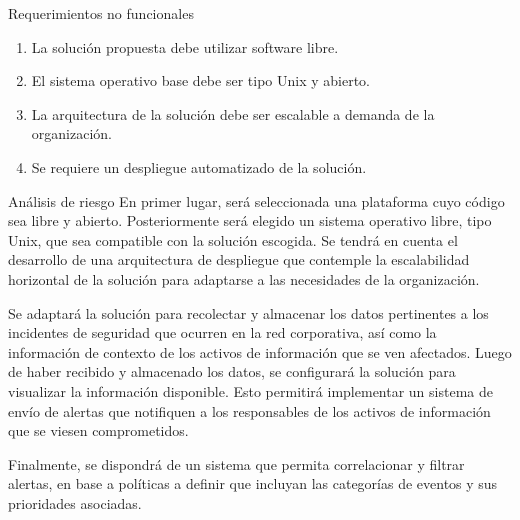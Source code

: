     \begin{section}{Requerimientos no funcionales}
    \begin{enumerate}
        \item La solución propuesta debe utilizar software libre.
        \item El sistema operativo base debe ser tipo Unix y abierto.
        \item La arquitectura de la solución debe ser escalable a demanda de la organización.
        \item Se requiere un despliegue automatizado de la solución.
    \end{enumerate}

    \end{section}
    
    \begin{section}{Análisis de riesgo}
    En primer lugar, será seleccionada una plataforma cuyo código sea libre y abierto. Posteriormente será elegido un sistema operativo libre, tipo Unix, que sea compatible con la solución escogida. Se tendrá en cuenta el desarrollo de una arquitectura de despliegue que contemple la escalabilidad horizontal de la solución para adaptarse a las necesidades de la organización. \par
    Se adaptará la solución para recolectar y almacenar los datos pertinentes a los incidentes de seguridad que ocurren en la red corporativa, así como la información de contexto de los activos de información que se ven afectados.  Luego de haber recibido y almacenado los datos, se configurará la solución para visualizar la información disponible. Esto permitirá implementar un sistema de envío de alertas que notifiquen a los responsables de los activos de información que se viesen comprometidos. \par
    Finalmente, se dispondrá de un sistema que permita correlacionar y filtrar alertas, en base a políticas a definir que incluyan las categorías de eventos y sus prioridades asociadas.\par
    \end{section}
    
    
